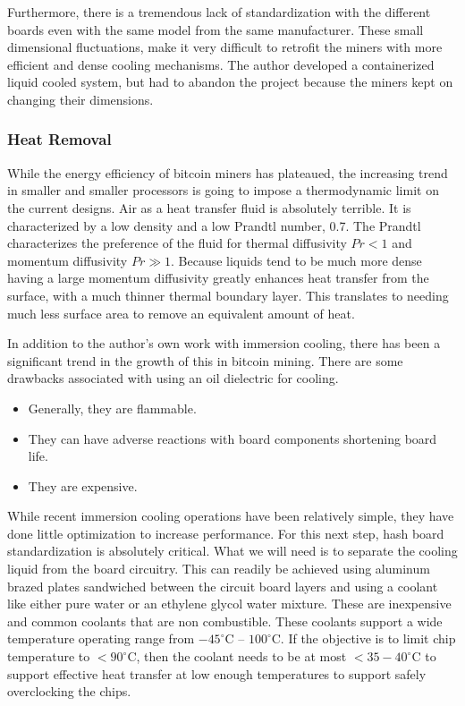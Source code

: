 \documentclass[runningheads]{llncs}
\begin{document}
Furthermore, there is a tremendous lack of standardization with the different boards even with the same model from the same manufacturer.
These small dimensional fluctuations, make it very difficult to retrofit the miners with more efficient and dense cooling mechanisms.
The author developed a containerized liquid cooled system, but had to abandon the project because the miners kept on changing their dimensions.

\subsubsection{Heat Removal}
While the energy efficiency of bitcoin miners has plateaued, the increasing trend in smaller and smaller processors is going to impose a thermodynamic limit on the current designs.
Air as a heat transfer fluid is absolutely terrible.
It is characterized by a low density and a low Prandtl number, 0.7.
The Prandtl characterizes the preference of the fluid for thermal diffusivity $Pr < 1$ and momentum diffusivity $Pr \gg 1$.
Because liquids tend to be much more dense having a large momentum diffusivity greatly enhances heat transfer from the surface, with a much thinner thermal boundary layer.
This translates to needing much less surface area to remove an equivalent amount of heat.

In addition to the author's own work with immersion cooling, there has been a significant trend in the growth of this in bitcoin mining.
There are some drawbacks associated with using an oil dielectric for cooling.
\begin{itemize}
    \item Generally, they are flammable.
    \item They can have adverse reactions with board components shortening board life.
    \item They are expensive.
\end{itemize}

While recent immersion cooling operations have been relatively simple, they have done little optimization to increase performance.
For this next step, hash board standardization is absolutely critical.
What we will need is to separate the cooling liquid from the board circuitry.
This can readily be achieved using aluminum brazed plates sandwiched between the circuit board layers and using a coolant like either pure water or an ethylene glycol water mixture.
These are inexpensive and common coolants that are non combustible.
These coolants support a wide temperature operating range from $-45^{\circ}\textrm{C}$ -- $100^{\circ}\textrm{C}$.
If the objective is to limit chip temperature to $<90^{\circ}\textrm{C}$, then the coolant needs to be at most $<35-40^{\circ}\textrm{C}$ to support effective heat transfer at low enough temperatures to support safely overclocking the chips.
\end{document}
